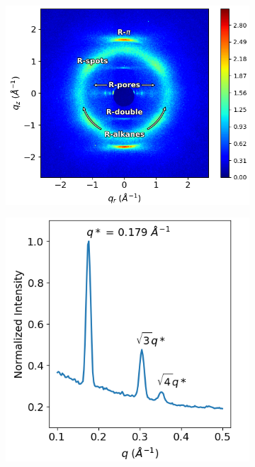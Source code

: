 \documentclass[journal=jpcbfk,manuscript=article]{achemso}
\begin{document}
  \begin{figure}[!htb]
        \centering
                \begin{subfigure}[t]{0.495\linewidth}
                \centering
                \includegraphics[width=\linewidth]{WAXS_annotated_words.png} 
                \caption{}\label{fig:WAXS}
        \end{subfigure}
	\begin{subfigure}[t]{0.405\linewidth}
                \centering
                \includegraphics[width=\linewidth]{SAXS.png}

\end{subfigure}
\end{figure}
\end{document}
